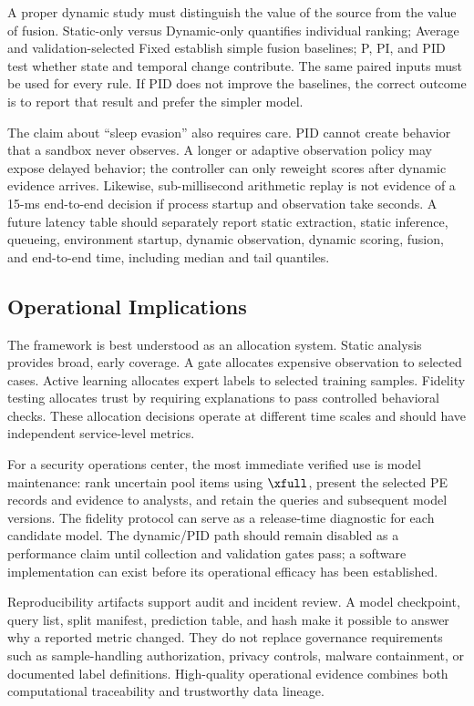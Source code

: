 A proper dynamic study must distinguish the value of the source from the value
of fusion. Static-only versus Dynamic-only quantifies individual ranking; Average
and validation-selected Fixed establish simple fusion baselines; P, PI, and PID
test whether state and temporal change contribute. The same paired inputs must be
used for every rule. If PID does not improve the baselines, the correct outcome
is to report that result and prefer the simpler model.

The claim about ``sleep evasion'' also requires care. PID cannot create behavior
that a sandbox never observes. A longer or adaptive observation policy may expose
delayed behavior; the controller can only reweight scores after dynamic evidence
arrives. Likewise, sub-millisecond arithmetic replay is not evidence of a
15-ms end-to-end decision if process startup and observation take seconds. A
future latency table should separately report static extraction, static inference,
queueing, environment startup, dynamic observation, dynamic scoring, fusion, and
end-to-end time, including median and tail quantiles.

\subsection{Operational Implications}

The framework is best understood as an allocation system. Static analysis
provides broad, early coverage. A gate allocates expensive observation to selected
cases. Active learning allocates expert labels to selected training samples.
Fidelity testing allocates trust by requiring explanations to pass controlled
behavioral checks. These allocation decisions operate at different time scales
and should have independent service-level metrics.

For a security operations center, the most immediate verified use is model
maintenance: rank uncertain pool items using $\xfull$, present the selected PE
records and evidence to analysts, and retain the queries and subsequent model
versions. The fidelity protocol can serve as a release-time diagnostic for each
candidate model. The dynamic/PID path should remain disabled as a performance
claim until collection and validation gates pass; a software implementation can
exist before its operational efficacy has been established.

Reproducibility artifacts support audit and incident review. A model checkpoint,
query list, split manifest, prediction table, and hash make it possible to answer
why a reported metric changed. They do not replace governance requirements such
as sample-handling authorization, privacy controls, malware containment, or
documented label definitions. High-quality operational evidence combines both
computational traceability and trustworthy data lineage.
